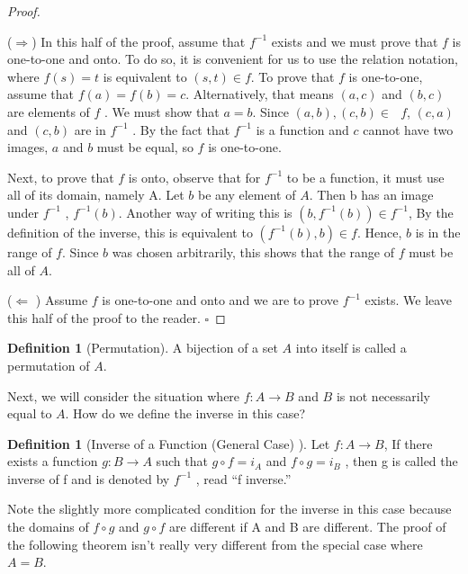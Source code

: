 \documentclass[10pt,]{book}
\theoremstyle{plain}
\theoremstyle{definition}
\newtheorem{definition}[theorem]{Definition}
\theoremstyle{definition}
\theoremstyle{definition}
\begin{document}
\begin{proof}\hypertarget{proof-3}{}
(\(\Rightarrow\))  In this half of the proof, assume that \(f^{-1}\) exists and we must prove that \(f\) is one-to-one and onto.
To do so, it is convenient for us to use the relation notation, where \(f(s)=t\) is equivalent to \((s,t)\in f\). To prove that \(f\) is
one-to-one, assume that \(f(a)=f(b) = c\). Alternatively, that means \((a, c)\) and \((b, c)\) are elements of \(f\) . We must show
that \(a =b\). Since \((a, b), (c, b) \in \text{  }f\), \((c, a)\) and \((c,b)\) are in \(f^{-1}\) . By the fact that \(f^{-1}\) is a function
and \(c\) cannot have two images, \(a\) and \(b\) must be equal, so \(f\) is one-to-one. %
\par
Next, to prove that \(f\) is onto, observe that for \(f^{-1}\) to be a function, it must use all of its domain, namely A. Let \(b\)
be any element of \(A\). Then b has an image under \(f^{-1}\) , \(f^{-1}(b)\). Another way of writing this is \(\left(b,f^{-1}(b)\right)\in
f^{-1}\), By the definition of the inverse, this is equivalent to \(\left(f^{-1}(b), b\right) \in  f\). Hence, \(b\) is in the range of \(f\). Since \(b\) was chosen arbitrarily, this shows that the range of \( f \) must be all of \(A\).%
\par
(\(\Leftarrow\) ) Assume \(f\) is one-to-one and onto and we are to prove \(f^{-1}\) exists. We leave this half of the proof to the reader.
\(\square\)%
\end{proof}
\begin{definition}[Permutation]\label{def-Permutation}
A bijection of a set \(A\) into itself is called a permutation of \(A\).%
\end{definition}
\par
Next, we will consider the situation where \(f: A \rightarrow B\) and \(B\) is not necessarily equal to \(A\). How do we define the inverse in this case?%
\begin{definition}[Inverse of a Function (General Case) ]\label{def-general-inverse-function}
Let \(f:A \rightarrow  B\), If there exists a function \(g:B \rightarrow  A\) such that \(g \circ f = i_A\) and \(f\circ  g = i_B\) , then g is called the inverse of f and is denoted by \(f^{-1}\) , read ``f inverse.''%
\end{definition}
\par
Note the slightly more complicated condition for the inverse in this case because the domains of \(f\circ  g\) and \(g \circ f\) are different if
A and B are different. The proof of the following theorem isn't really very different from the special case where \(A=B\).%
\end{document}
